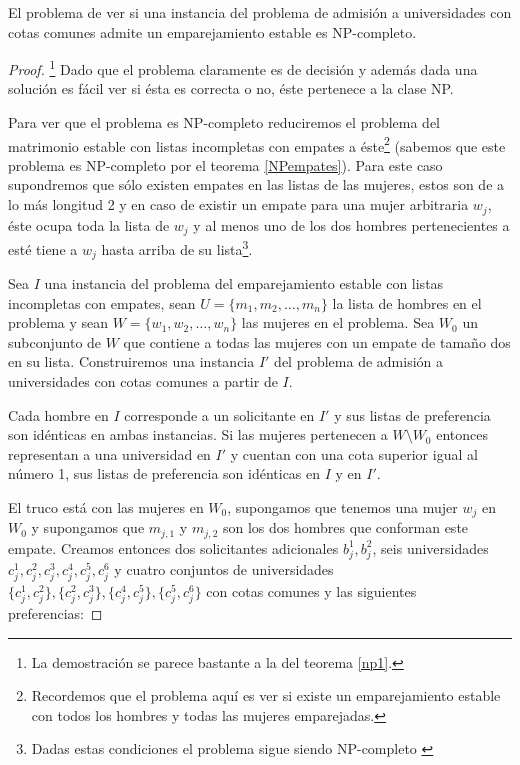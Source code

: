 \begin{teo} \cite{Todo}
El problema de ver si una instancia del problema de admisión a universidades con cotas comunes admite un emparejamiento estable es NP-completo. 
\end{teo}
\begin{proof}
\footnote{La demostración se parece bastante a la del teorema \ref{np1}.}
Dado que el problema claramente es de decisión y además dada una solución es fácil ver si ésta es correcta o no, éste pertenece a la clase NP.

Para ver que el problema es NP-completo reduciremos el problema del matrimonio estable con listas incompletas con empates a éste\footnote{Recordemos que el problema aquí es ver si existe un emparejamiento estable con todos los hombres y todas las mujeres emparejadas.} (sabemos que este problema es NP-completo por el teorema \ref{NPempates}). Para este caso supondremos que sólo existen empates en las listas de las mujeres, estos son de a lo más longitud 2 y en caso de existir un empate para una mujer arbitraria $w_j$, éste ocupa toda la lista de $w_j$ y al menos uno de los dos hombres pertenecientes a esté tiene a $w_j$ hasta arriba de su lista\footnote{Dadas estas condiciones el problema sigue siendo NP-completo \cite{empates}}. 

Sea $I$ una instancia del problema del emparejamiento estable con listas incompletas con empates, sean $U=\{m_1,m_2,\dots,m_n\}$ la lista de hombres en el problema y sean $W=\{w_1,w_2,\dots,w_n\}$ las mujeres en el problema. Sea $W_0$ un subconjunto de $W$ que contiene a todas las mujeres con un empate de tamaño dos en su lista. Construiremos una instancia $I'$ del problema de admisión a universidades con cotas comunes a partir de $I$. 

Cada hombre en $I$ corresponde a un solicitante en $I'$ y sus listas de preferencia son idénticas en ambas instancias. Si las mujeres pertenecen a $W \setminus W_0$ entonces representan a una universidad en $I'$ y cuentan con una cota superior igual al número 1, sus listas de preferencia son idénticas en $I$ y en $I'$. 

El truco está con las mujeres en $W_0$, supongamos que tenemos una mujer $w_j$ en $W_0$ y supongamos que $m_{j,1}$ y $m_{j,2}$ son los dos hombres que conforman este empate. Creamos entonces dos solicitantes adicionales $b_j^1,b_j^2$, seis universidades $c_j^1,c_j^2,c_j^3,c_j^4,c_j^5,c_j^6$ y cuatro conjuntos de universidades $\{c_j^1,c_j^2\},\{c_j^2,c_j^3\},\{c_j^4,c_j^5\},\{c_j^5,c_j^6\}$ con cotas comunes y las siguientes preferencias: 


\end{proof}

